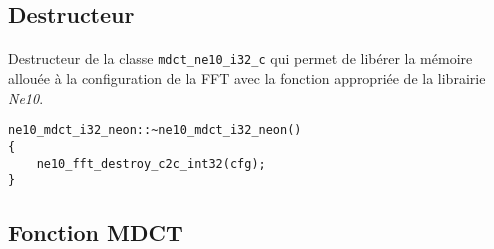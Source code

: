 \documentclass{article}
\begin{document}
\subsection{Destructeur}\label{app:mdct_ne10_i32_neon_destructor}
\paragraph{}
Destructeur de la classe \texttt{mdct\_ne10\_i32\_c} qui permet de libérer la mémoire allouée à la configuration de la FFT avec la fonction appropriée de la librairie \emph{Ne10}.
\lstset{language=C++}
\begin{lstlisting}
ne10_mdct_i32_neon::~ne10_mdct_i32_neon()
{
    ne10_fft_destroy_c2c_int32(cfg);
}
\end{lstlisting}

\subsection{Fonction MDCT}\label{app:mdct_ne10_i32_neon_func}
\end{document}

